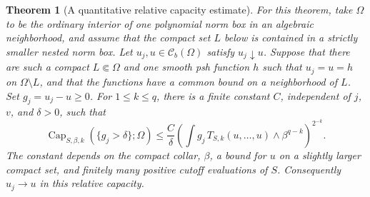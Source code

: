 \documentclass[11pt,a4paper]{article}
\numberwithin{equation}{section}
\newtheorem{theorem}{Theorem}[section]
\theoremstyle{definition}
\theoremstyle{remark}
\newcommand{\Cb}{\mathcal C_b}
\begin{document}
\begin{theorem}[A quantitative relative capacity estimate]
\label{thm:relative-capacity-estimate}
For this theorem, take $\Omega$ to be the ordinary interior of one
polynomial norm box in an algebraic neighborhood, and assume that
the compact set $L$ below is contained in a strictly smaller nested
norm box. Let $u_j,u\in\Cb(\Omega)$ satisfy $u_j\downarrow u$.
Suppose that there are such a compact $L\Subset\Omega$ and one smooth psh function $h$
such that $u_j=u=h$ on $\Omega\setminus L$, and that the functions
have a common bound on a neighborhood of $L$. Set $g_j=u_j-u\geq0$.
For $1\leq k\leq q$, there is a finite constant $C$, independent of
$j$, $v$, and $\delta>0$, such that
\begin{equation}
\label{eq:capacity-rate}
 \operatorname{Cap}_{S,\beta,k}(\{g_j>\delta\};\Omega)
 \leq\frac{C}{\delta}
   \left(\int g_j\,
      T_{S,k}(u,\ldots,u)\wedge\beta^{q-k}\right)^{2^{-k}}.
\end{equation}
The constant depends on the compact collar, $\beta$, a bound for $u$
on a slightly larger compact set, and finitely many positive cutoff
evaluations of $S$. Consequently $u_j\to u$ in this relative capacity.
\end{theorem}
\end{document}
